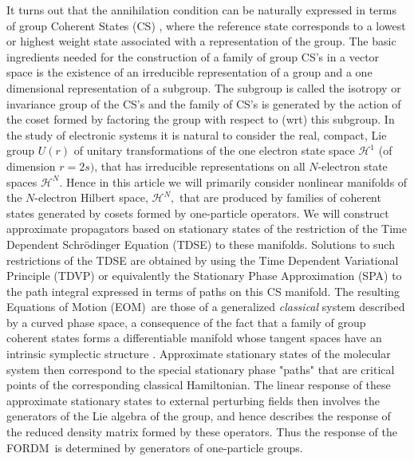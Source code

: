 \documentclass[aps,preprint]{revtex4}%
\begin{document}
It turns out that the annihilation condition can be naturally expressed in
terms of group Coherent States (CS) \cite{Perelomov_book}\cite{Klauder}%
\cite{Gilmore_book}, where the reference state corresponds to a lowest or
highest weight state associated with a representation of the group. The basic
ingredients needed for the construction of a family of group CS's in a vector
space is the existence of an irreducible representation of a group and a one
dimensional representation of a subgroup. The subgroup is called the isotropy
or invariance group of the CS's and the family of CS's is generated by the
action of the coset formed by factoring the group with respect to (wrt) this
subgroup. In the study of electronic systems it is natural to consider the
real, compact, \cite{Encyclo} Lie group $U(r)$ of unitary transformations of
the one electron state space $\mathcal{H}^{1}$ (of dimension $r=2s)$, that has
irreducible representations on all $N$-electron state spaces $\mathcal{H}^{N}%
$. Hence in this article we will primarily consider nonlinear manifolds of the
$N$-electron Hilbert space, $\mathcal{H}^{N},$ that are produced by families
of coherent states generated by cosets formed by one-particle operators. We
will construct approximate propagators based on stationary states of the
restriction of the Time Dependent Schr\"{o}dinger Equation (TDSE) to these
manifolds. Solutions to such restrictions of the TDSE are obtained by using
the Time Dependent Variational Principle (TDVP) \cite{Kramer81} or
equivalently the Stationary Phase Approximation (SPA) to the path integral
expressed in terms of paths on this CS manifold. The resulting Equations of
Motion (EOM)\ are those of a generalized \emph{classical }system described by
a curved phase space, a consequence of the fact that a family of group
coherent states forms a differentiable manifold \cite{Helgason78} whose
tangent spaces have an intrinsic symplectic structure \cite{Encyclo}.
Approximate stationary states of the molecular system then correspond to the
special stationary phase "paths" that are critical points of the corresponding
classical Hamiltonian. The linear response of these approximate stationary
states to external perturbing fields then involves the generators of the Lie
algebra of the group, and hence describes the response of the reduced density
matrix formed by these operators. Thus the response of the FORDM\ is
determined by generators of one-particle groups.
\end{document}

